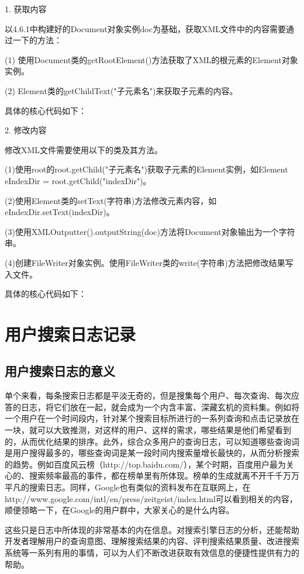 1. 获取内容

以4.6.1中构建好的Document对象实例doc为基础，获取XML文件中的内容需要通过一下的方法：

(1)	使用Document类的getRootElement()方法获取了XML的根元素的Element对象实例。

(2)	Element类的getChildText("子元素名")来获取子元素的内容。

具体的核心代码如下：



2. 修改内容

修改XML文件需要使用以下的类及其方法。

(1)使用root的root.getChild("子元素名")获取子元素的Element实例，如Element eIndexDir = root.getChild("indexDir")。

(2)使用Element类的setText(字符串)方法修改元素内容，如eIndexDir.setText(indexDir)。

(3)使用XMLOutputter().outputString(doc)方法将Document对象输出为一个字符串。

(4)创建FileWriter对象实例。使用FileWriter类的write(字符串)方法把修改结果写入文件。

具体的核心代码如下：



\section{用户搜索日志记录}
\subsection{用户搜索日志的意义}
单个来看，每条搜索日志都是平淡无奇的，但是搜集每个用户、每次查询、每次应答的日志，将它们放在一起，就会成为一个内含丰富、深藏玄机的资料集。例如将一个用户在一个时间段内，针对某个搜索目标所进行的一系列查询和点击记录放在一块，就可以大致推测，对这样的用户、这样的需求，哪些结果是他们希望看到的，从而优化结果的排序。此外，综合众多用户的查询日志，可以知道哪些查询词是用户搜得最多的，哪些查询词是某一段时间内搜索量增长最快的，从而分析搜索的趋势。例如百度风云榜（http://top.baidu.com/），某个时期，百度用户最为关心的、搜索频率最高的事件，都在榜单里有所体现。榜单的生成就离不开千千万万平凡的搜索日志。同样，Google也有类似的资料发布在互联网上，在http://www.google.com/intl/en/press/zeitgeist/index.html可以看到相关的内容，顺便领略一下，在Google的用户群中，大家关心的是什么内容。

这些只是日志中所体现的非常基本的内在信息。对搜索引擎日志的分析，还能帮助开发者理解用户的查询意图、理解搜索结果的内容、评判搜索结果质量、改进搜索系统等一系列有用的事情，可以为人们不断改进获取有效信息的便捷性提供有力的帮助。


